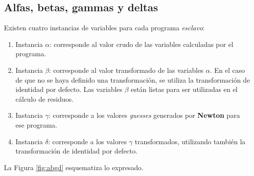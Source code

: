 \subsection*{Alfas, betas, gammas y deltas}
\label{ap1:abgd}

Existen cuatro instancias de variables para cada programa \textit{esclavo}:
\begin{enumerate}
\item Instancia $\alpha$: corresponde al valor crudo de las variables calculadas por el programa.
\item Instancia $\beta$: corresponde al valor transformado de las variables $\alpha$.
En el caso de que no se haya definido una transformación, se utiliza la transformación de identidad por defecto.
Las variables $\beta$ están listas para ser utilizadas en el cálculo de residuos.
\item Instancia $\gamma$: corresponde a los valores \textit{guesses} generados por \textbf{Newton} para ese programa.
\item Instancia $\delta$: corresponde a los valores $\gamma$ transformados, utilizando también la transformación de identidad por defecto.
\end{enumerate}
La Figura \ref{fig:abgd} esquematiza lo expresado.


